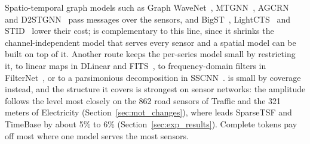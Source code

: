 {
Spatio-temporal graph models such as Graph WaveNet~\citep{wu2019graphwavenet}, MTGNN~\citep{wu2020mtgnn}, AGCRN~\citep{bai2020agcrn} and D2STGNN~\citep{shao2022decoupled} pass messages over the sensors, and BigST~\citep{han2024bigst}, LightCTS~\citep{lai2023lightcts} and STID~\citep{shao2022stid} lower their cost; \sysplus is complementary to this line, since it shrinks the channel-independent model that serves every sensor and a spatial model can be built on top of it. Another route keeps the per-series model small by restricting it, to linear maps in DLinear and FITS~\citep{fits2024}, to frequency-domain filters in FilterNet~\citep{filternet2024}, or to a parsimonious decomposition in SSCNN~\citep{deng2024parsimony}. \sysplus is small by coverage instead, and the structure it covers is strongest on sensor networks: the amplitude follows the level most closely on the 862 road sensors of Traffic and the 321 meters of Electricity (Section~\ref{sec:mot_changes}), where \sysplus leads SparseTSF and TimeBase by about 5\% to 6\% (Section~\ref{sec:exp_results}). Complete tokens pay off most where one model serves the most sensors.
}
